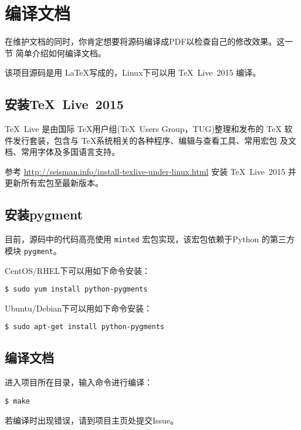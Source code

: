 \section{编译文档}
在维护文档的同时，你肯定想要将源码编译成PDF以检查自己的修改效果。这一节
简单介绍如何编译文档。

该项目源码是用 \LaTeX 写成的，Linux下可以用 \TeX~Live~2015 编译。

\subsection{安装\TeX~Live~2015}
\TeX~Live 是由国际 \TeX 用户组(\TeX~Users Group，TUG)整理和发布的 \TeX
软件发行套装，包含与 \TeX 系统相关的各种程序、编辑与查看工具、常用宏包
及文档、常用字体及多国语言支持。

参考 \url{http://seisman.info/install-texlive-under-linux.html} 安装
TeX~Live~2015 并更新所有宏包至最新版本。

\subsection{安装pygment}
目前，源码中的代码高亮使用 \texttt{minted} 宏包实现，该宏包依赖于Python
的第三方模块 \texttt{pygment}。

CentOS/RHEL下可以用如下命令安装：
\begin{verbatim}
$ sudo yum install python-pygments
\end{verbatim}

Ubuntu/Debian下可以用如下命令安装：
\begin{verbatim}
$ sudo apt-get install python-pygments
\end{verbatim}

\subsection{编译文档}
进入项目所在目录，输入命令进行编译：
\begin{verbatim}
$ make
\end{verbatim}
若编译时出现错误，请到项目主页处提交Issue。

